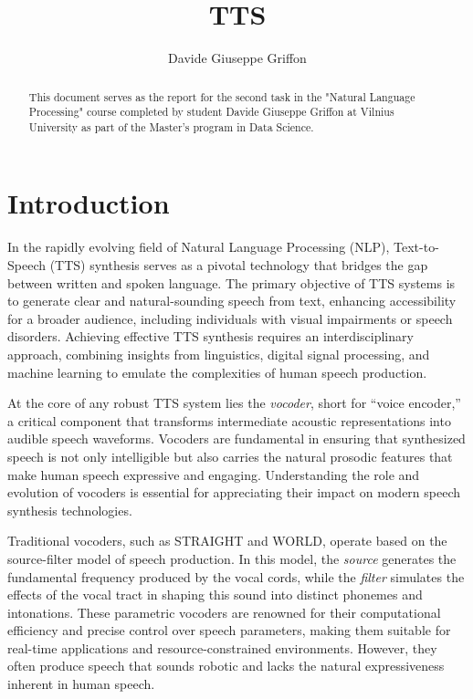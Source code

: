 \documentclass[12pt]{article}
\title{TTS}
\author{Davide Giuseppe Griffon}
\date{}
\begin{document}
\maketitle

\begin{abstract}
    This document serves as the report for the second task in the "Natural Language Processing" course completed by student Davide Giuseppe Griffon at Vilnius University as part of the Master's program in Data Science.
\end{abstract}

\tableofcontents

\newpage

\section{Introduction}

In the rapidly evolving field of Natural Language Processing (NLP), Text-to-Speech (TTS) synthesis serves as a pivotal technology that bridges the gap between written and spoken language. The primary objective of TTS systems is to generate clear and natural-sounding speech from text, enhancing accessibility for a broader audience, including individuals with visual impairments or speech disorders. Achieving effective TTS synthesis requires an interdisciplinary approach, combining insights from linguistics, digital signal processing, and machine learning to emulate the complexities of human speech production.

At the core of any robust TTS system lies the \textit{vocoder}, short for ``voice encoder,'' a critical component that transforms intermediate acoustic representations into audible speech waveforms. Vocoders are fundamental in ensuring that synthesized speech is not only intelligible but also carries the natural prosodic features that make human speech expressive and engaging. Understanding the role and evolution of vocoders is essential for appreciating their impact on modern speech synthesis technologies.

Traditional vocoders, such as STRAIGHT and WORLD, operate based on the source-filter model of speech production. In this model, the \textit{source} generates the fundamental frequency produced by the vocal cords, while the \textit{filter} simulates the effects of the vocal tract in shaping this sound into distinct phonemes and intonations. These parametric vocoders are renowned for their computational efficiency and precise control over speech parameters, making them suitable for real-time applications and resource-constrained environments. However, they often produce speech that sounds robotic and lacks the natural expressiveness inherent in human speech.
\end{document}
